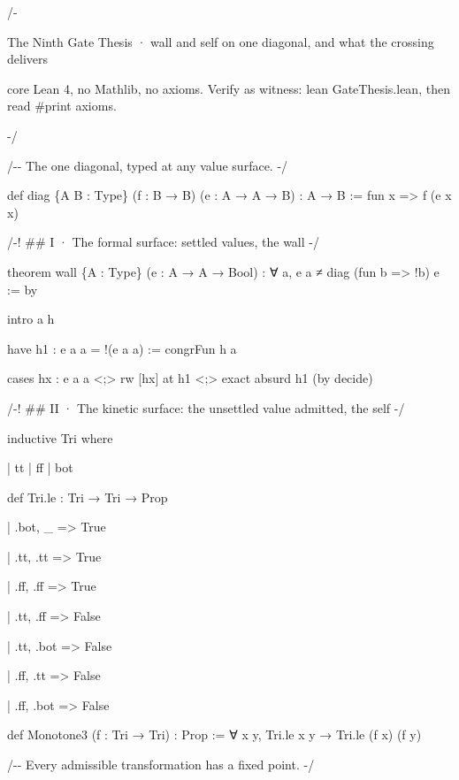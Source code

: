 \documentclass[10pt,twocolumn]{article}
\newenvironment{Shaded}{}{}
\newcommand{\NormalTok}[1]{#1}
\providecommand{\NormalTok}[1]{#1}
\providecommand{\NormalTok}[1]{#1}
\begin{document}
\begin{strip}
\begin{Shaded}
\begin{Highlighting}[]
\NormalTok{/{-}}

\NormalTok{  The Ninth Gate Thesis · wall and self on one diagonal, and what the crossing delivers}

\NormalTok{  core Lean 4, no Mathlib, no axioms. Verify as witness: \textasciigrave{}lean GateThesis.lean\textasciigrave{}, then read \#print axioms.}

\NormalTok{{-}/}

\NormalTok{/{-}{-} The one diagonal, typed at any value surface. {-}/}

\NormalTok{def diag \{A B : Type\} (f : B → B) (e : A → A → B) : A → B := fun x =\textgreater{} f (e x x)}

\NormalTok{/{-}! \#\# I · The formal surface: settled values, the wall {-}/}

\NormalTok{theorem wall \{A : Type\} (e : A → A → Bool) : ∀ a, e a ≠ diag (fun b =\textgreater{} !b) e := by}

\NormalTok{  intro a h}

\NormalTok{  have h1 : e a a = !(e a a) := congrFun h a}

\NormalTok{  cases hx : e a a \textless{};\textgreater{} rw [hx] at h1 \textless{};\textgreater{} exact absurd h1 (by decide)}

\NormalTok{/{-}! \#\# II · The kinetic surface: the unsettled value admitted, the self {-}/}

\NormalTok{inductive Tri where}

\NormalTok{  | tt | ff | bot}

\NormalTok{def Tri.le : Tri → Tri → Prop}

\NormalTok{  | .bot, \_ =\textgreater{} True}

\NormalTok{  | .tt, .tt =\textgreater{} True}

\NormalTok{  | .ff, .ff =\textgreater{} True}

\NormalTok{  | .tt, .ff =\textgreater{} False}

\NormalTok{  | .tt, .bot =\textgreater{} False}

\NormalTok{  | .ff, .tt =\textgreater{} False}

\NormalTok{  | .ff, .bot =\textgreater{} False}

\NormalTok{def Monotone3 (f : Tri → Tri) : Prop := ∀ x y, Tri.le x y → Tri.le (f x) (f y)}

\NormalTok{/{-}{-} Every admissible transformation has a fixed point. {-}/}


\end{Highlighting}
\end{Shaded}
\end{strip}
\end{document}
